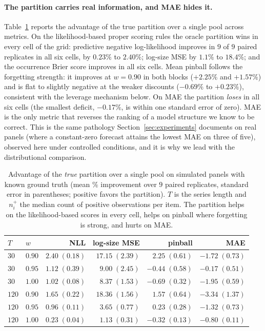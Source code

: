 \documentclass[twocolumn,10pt]{article}
\begin{document}
\paragraph{The partition carries real information, and MAE hides it.}
Table~\ref{tab:sanity} reports the advantage of the true partition over a
single pool across metrics. On the likelihood-based proper scoring rules
the oracle partition wins in every cell of the grid: predictive negative
log-likelihood improves in $9$ of $9$ paired replicates in all six
cells, by $0.23\%$ to $2.40\%$; log-size MSE by $1.1\%$ to $18.4\%$; and
the occurrence Brier score improves in all six cells. Mean pinball
follows the forgetting strength: it improves at $w{=}0.90$ in both
blocks ($+2.25\%$ and $+1.57\%$) and is flat to slightly negative at the
weaker discounts ($-0.69\%$ to $+0.23\%$), consistent with the leverage
mechanism below. On MAE the partition \emph{loses} in all six cells
(the smallest deficit, $-0.17\%$, is within one standard error of
zero). MAE is the only metric that reverses the ranking of a
model structure we know to be correct. This is the same pathology
Section~\ref{sec:experiments} documents on real panels (where a constant-zero
forecast attains the lowest MAE on three of five), observed here under
controlled conditions, and it is why we lead with the distributional
comparison.

\begin{table}[t]
\centering
\caption{Advantage of the \emph{true} partition over a single pool on
simulated panels with known ground truth (mean \% improvement over $9$
paired replicates, standard error in parentheses; positive favors the
partition). $T$ is the series length and $n_i^{+}$ the median count of
positive observations per item. The partition helps on the
likelihood-based scores in every cell, helps on pinball where
forgetting is strong, and hurts on MAE.}
\label{tab:sanity}
\begin{tabular}{llrrrr}
\toprule
$T$ & $w$ & NLL & log-size MSE & pinball & MAE\\
\midrule
$30$ & $0.90$ & $2.40\;(0.18)$ & $17.15\;(2.39)$ & $2.25\;(0.61)$ & $-1.72\;(0.73)$\\
$30$ & $0.95$ & $1.12\;(0.39)$ & $9.00\;(2.45)$ & $-0.44\;(0.58)$ & $-0.17\;(0.51)$\\
$30$ & $1.00$ & $1.02\;(0.08)$ & $8.37\;(1.53)$ & $-0.69\;(0.32)$ & $-1.95\;(0.59)$\\
$120$ & $0.90$ & $1.65\;(0.22)$ & $18.36\;(1.56)$ & $1.57\;(0.64)$ & $-3.34\;(1.37)$\\
$120$ & $0.95$ & $0.96\;(0.11)$ & $3.65\;(0.77)$ & $0.23\;(0.28)$ & $-1.32\;(0.73)$\\
$120$ & $1.00$ & $0.23\;(0.04)$ & $1.13\;(0.31)$ & $-0.32\;(0.13)$ & $-0.80\;(0.11)$\\
\bottomrule
\end{tabular}
\end{table}
\end{document}
